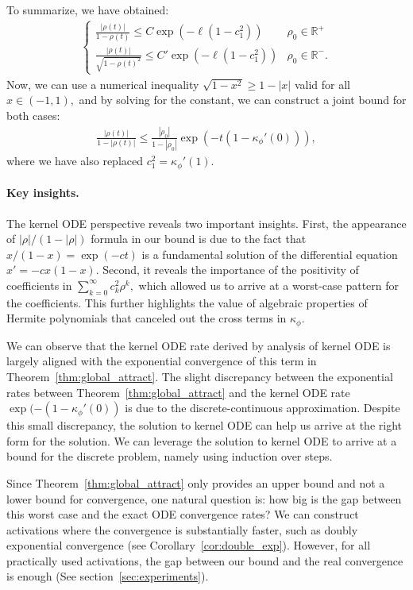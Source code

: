\documentclass[twoside]{article}
\newcommand{\km}{\kappa_\phi}
\newcommand{\R}{\mathbb{R}}
\newcommand{\he}{\mathrm{he}}
\theoremstyle{definition}
\begin{document}
To summarize, we have obtained:
\begin{align*}
    \begin{cases}
        \frac{|\rho(t)|}{1-\rho(t)} \le C \exp(-\ell(1-c_1^2)) & \rho_0 \in \R^+\\
        \frac{|\rho(t)|}{\sqrt{1-\rho(t)^2}}\le C' \exp(-\ell(1-c_1^2)) & \rho_0\in\R^-.
    \end{cases}
\end{align*}
Now, we can use a numerical inequality $\sqrt{1-x^2} \ge 1-|x|$ valid for all $x\in(-1,1),$ and by solving for the constant, we can construct a joint bound for both cases:
\begin{align*}
    \frac{|\rho(t)|}{1-|\rho(t)|} \le \frac{|\rho_0|}{1-|\rho_0|} \exp(-t (1-\km'(0))), 
\end{align*}
where we have also replaced $c_1^2=\km'(1).$  

\paragraph{Key insights.}
The kernel ODE perspective reveals two important insights. 
First, the appearance of $|\rho|/(1-|\rho|)$ formula in our bound is due to the fact that $x/(1-x) = \exp( -c t) $ is a fundamental solution of the differential equation $x' = - c x(1-x).$ Second, it reveals the importance of the positivity of coefficients in $\sum_{k=0}^\infty c_k^2\rho^k,$ which allowed us to arrive at a worst-case pattern for the coefficients. 
This further highlights the value of algebraic properties of Hermite polynomials that canceled out the cross terms in $\km.$

We can observe that the kernel ODE rate derived by analysis of kernel ODE is largely aligned with the exponential convergence of this term in Theorem~\ref{thm:global_attract}. The slight discrepancy between the exponential rates between Theorem~\ref{thm:global_attract} and the kernel ODE rate $\exp(-(1-\km'(0))$ is due to the discrete-continuous approximation. Despite this small discrepancy, the solution to kernel ODE can help us arrive at the right form for the solution. We can leverage the solution to kernel ODE to arrive at a bound for the discrete problem, namely using induction over steps.

Since Theorem~\ref{thm:global_attract} only provides an upper bound and not a lower bound for convergence, one natural question is: how big is the gap between this worst case and the exact ODE convergence rates? We can construct activations where the convergence is substantially faster, such as doubly exponential convergence (see Corollary~\ref{cor:double_exp}). However, for all practically used activations, the gap between our bound and the real convergence is enough (See section~\ref{sec:experiments}).
\end{document}

